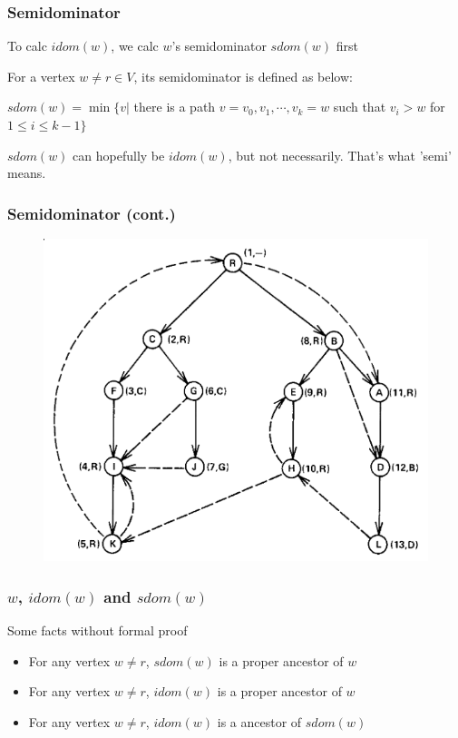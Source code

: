 \documentclass[]{beamer}
\begin{document}
\begin{frame}
  \frametitle{Semidominator}
  To calc $idom(w)$, we calc $w$'s \alert{semidominator} $sdom(w)$ first

  \pause
  \begin{definition}
    For a vertex $w \neq r \in V$, its \alert{semidominator} is defined as below:

    $sdom(w) = \min \{ v | $ there is a path $v=v_0, v_1, \cdots, v_k=w$ such that
    $v_i>w$ for $1 \leq i \leq k-1 \}$
  \end{definition}

  \pause
  $sdom(w)$ can hopefully be $idom(w)$, but \alert{not} necessarily. That's what 'semi' means.
\end{frame}

\begin{frame}
  \frametitle{Semidominator (cont.)}
  \begin{figure}
    \includegraphics[height=.55\textheight]{figures/dfst}
  \end{figure}
\end{frame}

\begin{frame}
  \frametitle{$w$, $idom(w)$ and $sdom(w)$}
  Some facts without formal proof
  \begin{itemize}
    \item For any vertex $w \neq r$, $sdom(w)$ is a proper ancestor of $w$
    \item For any vertex $w \neq r$, $idom(w)$ is a proper ancestor of $w$
    \item For any vertex $w \neq r$, $idom(w)$ is a ancestor of $sdom(w)$
  \end{itemize}
\end{frame}
\end{document}
